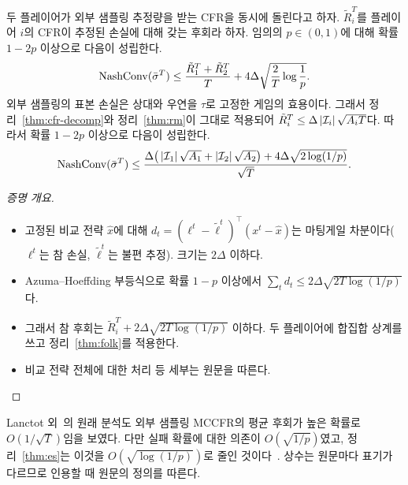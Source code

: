 \begin{theorem}\label{thm:es}
두 플레이어가 외부 샘플링 추정량을 받는 CFR을 동시에 돌린다고 하자. $\tilde R_i^T$를 플레이어 $i$의 CFR이 추정된 손실에 대해 갖는 후회라 하자.
임의의 $p\in(0,1)$에 대해 확률 $1-2p$ 이상으로 다음이 성립한다.
\[
\mathrm{NashConv}(\bar\sigma^T)\le\frac{\tilde R_1^T+\tilde R_2^T}{T}+4\Delta\sqrt{\frac2T\log\frac1p}.
\]
외부 샘플링의 표본 손실은 상대와 우연을 $\tau$로 고정한 게임의 효용이다. 그래서 정리~\ref{thm:cfr-decomp}와 정리~\ref{thm:rm}이 그대로 적용되어 $\tilde R_i^T\le\Delta\left\lvert \mathcal{I}_i\right\rvert\sqrt{A_iT}$다. 따라서 확률 $1-2p$ 이상으로 다음이 성립한다.
\[
\mathrm{NashConv}(\bar\sigma^T)\le\frac{\Delta\big(\left\lvert \mathcal{I}_1\right\rvert\sqrt{A_1}+\left\lvert \mathcal{I}_2\right\rvert\sqrt{A_2}\big)+4\Delta\sqrt{2\log(1/p)}}{\sqrt T}.
\]
\end{theorem}
\begin{proof}[증명 개요]\mbox{}
\begin{itemize}
  \item 고정된 비교 전략 $\hat x$에 대해 $d_t=(\ell^t-\tilde\ell^t)^\top(x^t-\hat x)$는 마팅게일 차분이다($\ell^t$는 참 손실, $\tilde\ell^t$는 불편 추정). 크기는 $2\Delta$ 이하다.
  \item Azuma–Hoeffding 부등식으로 확률 $1-p$ 이상에서 $\sum_td_t\le2\Delta\sqrt{2T\log(1/p)}$다.
  \item 그래서 참 후회는 $\tilde R_i^T+2\Delta\sqrt{2T\log(1/p)}$ 이하다. 두 플레이어에 합집합 상계를 쓰고 정리~\ref{thm:folk}를 적용한다.
  \item 비교 전략 전체에 대한 처리 등 세부는 원문을 따른다.
\end{itemize}
\end{proof}

\begin{remark}
Lanctot 외~\citep{lanctot2009monte}의 원래 분석도 외부 샘플링 MCCFR의 평균 후회가 높은 확률로 $O(1/\sqrt T)$임을 보였다. 다만 실패 확률에 대한 의존이 $O(\sqrt{1/p})$였고, 정리~\ref{thm:es}는 이것을 $O(\sqrt{\log(1/p)})$로 줄인 것이다~\citep{farina2020stochastic}.
상수는 원문마다 표기가 다르므로 인용할 때 원문의 정의를 따른다.
\end{remark}


